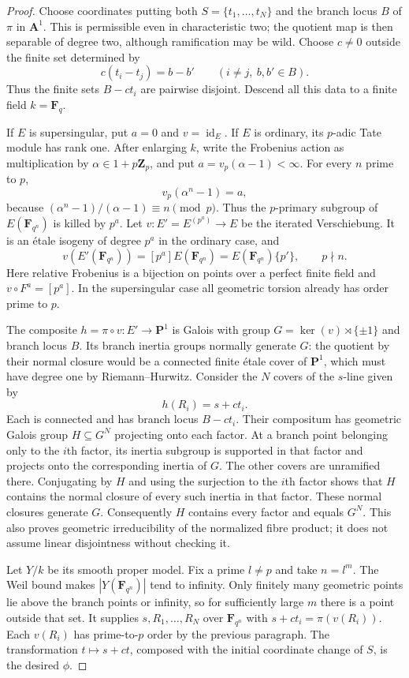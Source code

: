 \documentclass[11pt,a4paper]{article}
\newcommand{\Z}{\mathbf Z}
\newcommand{\F}{\mathbf F}
\begin{document}
\begin{proof}
Choose coordinates putting both $S=\{t_1,\ldots,t_N\}$ and the
branch locus $B$ of $\pi$ in $\mathbf A^1$. This is permissible even
in characteristic two; the quotient map is then separable of degree
two, although ramification may be wild. Choose $c\ne0$ outside the
finite set determined by
\[
 c(t_i-t_j)=b-b'\qquad(i\ne j,\ b,b'\in B).
\]
Thus the finite sets $B-ct_i$ are pairwise disjoint. Descend all this
data to a finite field $k=\F_q$.

If $E$ is supersingular, put $a=0$ and $v=\operatorname{id}_E$.
If $E$ is ordinary, its $p$-adic Tate module has rank one. After
enlarging $k$, write the Frobenius action as multiplication by
$\alpha\in1+p\Z_p$, and put $a=v_p(\alpha-1)<\infty$.
For every $n$ prime to $p$,
\[
 v_p(\alpha^n-1)=a,
\]
because $(\alpha^n-1)/(\alpha-1)\equiv n\pmod p$.
Thus the $p$-primary subgroup of $E(\F_{q^n})$ is killed by $p^a$.
Let $v:E'=E^{(p^a)}\to E$ be the iterated Verschiebung. It is an
\'etale isogeny of degree $p^a$ in the ordinary case, and
\[
 v(E'(\F_{q^n}))=[p^a]E(\F_{q^n})
                 =E(\F_{q^n})\{p'\},\qquad p\nmid n.
\]
Here relative Frobenius is a bijection on points over a perfect
finite field and $v\circ F^a=[p^a]$. In the supersingular case all
geometric torsion already has order prime to $p$.

The composite $h=\pi\circ v:E'\to\mathbf P^1$ is Galois with
group $G=\ker(v)\rtimes\{\pm1\}$ and branch locus $B$.
Its branch inertia groups normally generate $G$: the quotient by
their normal closure would be a connected finite \'etale cover of
$\mathbf P^1$, which must have degree one by Riemann--Hurwitz.
Consider the $N$ covers of the $s$-line given by
\[
 h(R_i)=s+ct_i.
\]
Each is connected and has branch locus $B-ct_i$. Their compositum
has geometric Galois group $H\subseteq G^N$ projecting onto each
factor. At a branch point belonging only to the $i$th factor, its
inertia subgroup is supported in that factor and projects onto the
corresponding inertia of $G$. The other covers are unramified there.
Conjugating by $H$ and using the surjection to the $i$th factor shows
that $H$ contains the normal closure of every such inertia in that
factor. These normal closures generate $G$. Consequently $H$ contains
every factor and equals $G^N$. This also proves geometric
irreducibility of the normalized fibre product; it does not assume
linear disjointness without checking it.

Let $Y/k$ be its smooth proper model. Fix a prime $l\ne p$ and take
$n=l^m$. The Weil bound makes $|Y(\F_{q^n})|$ tend to infinity.
Only finitely many geometric points lie above the branch points or
infinity, so for sufficiently large $m$ there is a point outside that
set. It supplies $s,R_1,\ldots,R_N$ over $\F_{q^n}$ with
$s+ct_i=\pi(v(R_i))$. Each $v(R_i)$ has prime-to-$p$ order by the
previous paragraph. The transformation $t\mapsto s+ct$, composed
with the initial coordinate change of $S$, is the desired $\phi$.
\end{proof}
\end{document}
